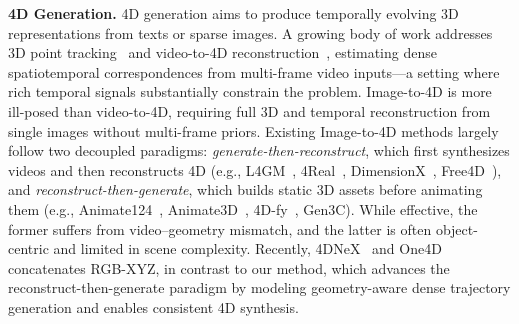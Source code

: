 \vspace{4pt}
\noindent\textbf{4D Generation.}
4D generation aims to produce temporally evolving 3D representations from texts or sparse images. A growing body of work addresses 3D point tracking~\cite{karaev2024cotracker,karaev2025cotracker3,xiao2024spatialtracker, xiao2025spatialtrackerv2, delta, feng2025st4rtrack, lin2025dgs, lin2025movies} and video-to-4D reconstruction~\cite{xie2024sv4d, wang2025shape, sv4d2, wu2024sc4d, consistent4d, geo4d, yao2025uni4d,wu20254d,gs-dit,cat4d}, estimating dense spatiotemporal correspondences from multi-frame video inputs—a setting where rich temporal signals substantially constrain the problem. Image-to-4D is more ill-posed than video-to-4D, requiring full 3D and temporal reconstruction from single images without multi-frame priors. Existing Image-to-4D methods largely follow two decoupled paradigms: \textit{generate-then-reconstruct}, which first synthesizes videos and then reconstructs 4D (e.g., L4GM~\cite{l4gm}, 4Real~\cite{4real}, DimensionX~\cite{dimensionX}, Free4D~\cite{free4d}), and \textit{reconstruct-then-generate}, which builds static 3D assets before animating them (e.g., Animate124~\cite{animate124}, Animate3D~\cite{animate3d}, 4D-fy~\cite{4dfy}, Gen3C\cite{gen3c}). While effective, the former suffers from video–geometry mismatch, and the latter is often object-centric and limited in scene complexity. Recently, 4DNeX~\cite{4dnex} and One4D~\cite{mi2025one4d} concatenates RGB-XYZ, in contrast to our method, which advances the reconstruct-then-generate paradigm by modeling geometry-aware dense trajectory generation and enables consistent 4D synthesis.

